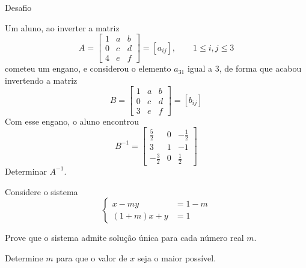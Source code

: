 \begin{exercicios}{Desafio}
    \begin{exercicio}
        Um aluno, ao inverter a matriz
        \[A = \left[\begin{array}{ccc}
        1 & a & b \\
        0 & c & d \\
        4 & e & f
        \end{array} \right]
        =\left[a_{ij}\right], \qquad 1 \leq	i, j \leq 3
        \]
        cometeu um engano, e considerou o elemento $a_{31}$ igual a $3$, de forma que acabou invertendo a matriz
        \[B = \left[\begin{array}{ccc}
        1 & a & b \\
        0 & c & d \\
        3 & e & f
        \end{array} \right]	= \left[b_{ij} \right] 
        \]
        Com esse engano, o aluno encontrou 
        \[B^{-1} = \left[\begin{array}{rrr}
        \frac{5}{2} & 0 & -\frac{1}{2} \\[2mm]
        3 & 1 &           -1 \\[2mm]
        -\frac{3}{2} & 0 &  \frac{1}{2}
        \end{array} \right]\]
        Determinar $A^{-1}$.
    \end{exercicio}
    
    \begin{exercicio}
        Considere o sistema
        \[\begin{cases}
        x - my       &= 1 - m \\[2mm]
        (1 + m)x + y &= 1
        \end{cases}\]
        \begin{alphalist}
            \item Prove que o sistema admite solução única para cada número real $m$.
            \item Determine $m$ para que o valor de $x$ seja o maior possível.
        \end{alphalist}
    \end{exercicio}
    

\end{exercicios}
